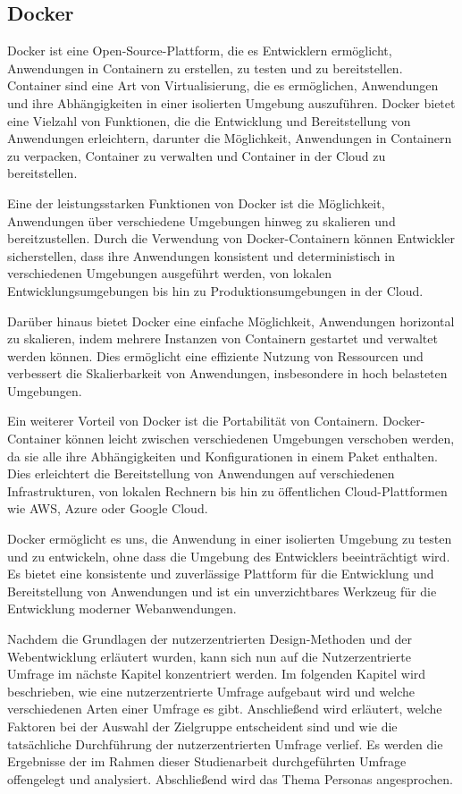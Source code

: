 \subsection{Docker}

Docker ist eine Open-Source-Plattform, die es Entwicklern ermöglicht, Anwendungen in Containern zu erstellen, zu testen und zu bereitstellen. Container sind eine Art von Virtualisierung, die es ermöglichen, Anwendungen und ihre Abhängigkeiten in einer isolierten Umgebung auszuführen. Docker bietet eine Vielzahl von Funktionen, die die Entwicklung und Bereitstellung von Anwendungen erleichtern, darunter die Möglichkeit, Anwendungen in Containern zu verpacken, Container zu verwalten und Container in der Cloud zu bereitstellen.

Eine der leistungsstarken Funktionen von Docker ist die Möglichkeit, Anwendungen über verschiedene Umgebungen hinweg zu skalieren und bereitzustellen. Durch die Verwendung von Docker-Containern können Entwickler sicherstellen, dass ihre Anwendungen konsistent und deterministisch in verschiedenen Umgebungen ausgeführt werden, von lokalen Entwicklungsumgebungen bis hin zu Produktionsumgebungen in der Cloud.

Darüber hinaus bietet Docker eine einfache Möglichkeit, Anwendungen horizontal zu skalieren, indem mehrere Instanzen von Containern gestartet und verwaltet werden können. Dies ermöglicht eine effiziente Nutzung von Ressourcen und verbessert die Skalierbarkeit von Anwendungen, insbesondere in hoch belasteten Umgebungen.

Ein weiterer Vorteil von Docker ist die Portabilität von Containern. Docker-Container können leicht zwischen verschiedenen Umgebungen verschoben werden, da sie alle ihre Abhängigkeiten und Konfigurationen in einem Paket enthalten. Dies erleichtert die Bereitstellung von Anwendungen auf verschiedenen Infrastrukturen, von lokalen Rechnern bis hin zu öffentlichen Cloud-Plattformen wie AWS, Azure oder Google Cloud.

Docker ermöglicht es uns, die Anwendung in einer isolierten Umgebung zu testen und zu entwickeln, ohne dass die Umgebung des Entwicklers beeinträchtigt wird. Es bietet eine konsistente und zuverlässige Plattform für die Entwicklung und Bereitstellung von Anwendungen und ist ein unverzichtbares Werkzeug für die Entwicklung moderner Webanwendungen. \cite{docker}

Nachdem die Grundlagen der nutzerzentrierten Design-Methoden und der Webentwicklung erläutert wurden, kann sich nun auf die Nutzerzentrierte Umfrage im nächste Kapitel konzentriert werden.
Im folgenden Kapitel wird beschrieben, wie eine nutzerzentrierte Umfrage aufgebaut wird und welche verschiedenen Arten einer Umfrage es gibt.
Anschließend wird erläutert, welche Faktoren bei der Auswahl der Zielgruppe entscheident sind und wie die tatsächliche Durchführung der nutzerzentrierten Umfrage verlief.
Es werden die Ergebnisse der im Rahmen dieser Studienarbeit durchgeführten Umfrage offengelegt und analysiert.
Abschließend wird das Thema Personas angesprochen.
